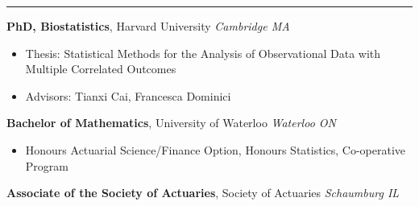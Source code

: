 \documentclass[10pt,english]{report}
\begin{document}
\vspace{5mm}

{}
\vspace{1mm}\hrule
\vspace{1mm}


\textbf{PhD, Biostatistics}, Harvard University \hfill \textit{Cambridge MA} \texttt{}
\begin{itemize}
\item Thesis: Statistical Methods for the Analysis of Observational Data with Multiple Correlated Outcomes
\item Advisors: Tianxi Cai, Francesca Dominici
\end{itemize}

\vspace{1mm}

\textbf{Bachelor of Mathematics}, University of Waterloo \hfill \textit{Waterloo ON} \texttt{}
\begin{itemize}
\item Honours Actuarial Science/Finance Option, Honours Statistics, Co-operative
Program
\end{itemize}

\vspace{1mm}

\textbf{Associate of the Society of Actuaries}, Society of Actuaries \hfill \textit{Schaumburg IL} \texttt{}
\end{document}
